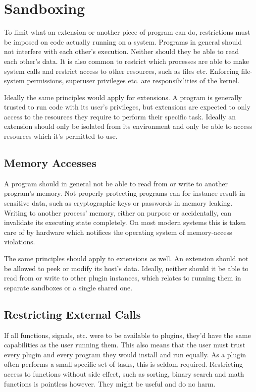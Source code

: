 \chapter {Sandboxing}

To limit what an extension or another piece of program can do, restrictions
must be imposed on code actually running on a system. Programs in general
should not interfere with each other's execution. Neither should they be able
to read each other's data. It is also common to restrict which processes are
able to make system calls and restrict access to other resources, such as files
etc. Enforcing file-system permissions, superuser privileges etc. are
responsibilities of the kernel.

Ideally the same principles would apply for extensions. A program is generally
trusted to run code with its user's privileges, but extensions are expected to
only access to the resources they require to perform their specific task.
Ideally an extension should only be isolated from its environment and only be
able to access resources which it's permitted to use.


\section {Memory Accesses}

A program should in general not be able to read from or write to another
program's memory. Not properly protecting programs can for instance result in
sensitive data, such as cryptographic keys or passwords in memory leaking.
Writing to another process' memory, either on purpose or accidentally, can
invalidate its executing state completely. On most modern systems this is taken
care of by hardware which notifices the operating system of memory-access
violations.

The same principles should apply to extensions as well. An extension should not
be allowed to peek or modify its host's data. Ideally, neither should it be
able to read from or write to other plugin instances, which relates to running
them in separate sandboxes or a single shared one.


\section {Restricting External Calls}

If all functions, signals, etc. were to be available to plugins, they'd have the
same capabilities as the user running them. This also means that the user must
trust every plugin and every program they would install and run equally. As a
plugin often performs a small specific set of tasks, this is seldom required.
Restricting access to functions without side effect, such as sorting, binary
search and math functions is pointless however. They might be useful and do no
harm.

